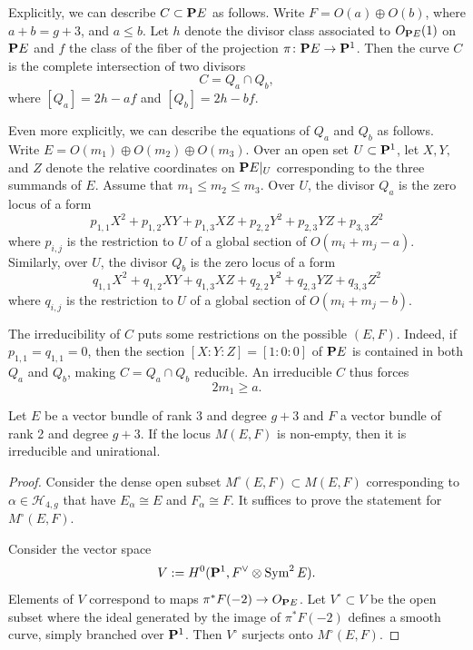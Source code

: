 \documentclass{article}
\renewcommand {\P}{{\bf P}}
\providecommand {\from}{{\colon}}
\providecommand{\Sym}{\operatorname{Sym}}
\renewcommand{\H}{\mathcal H}
\numberwithin{equation}{section}
\begin{document}
Explicitly, we can describe $C \subset \P E$ as follows. Write $F =
O(a) \oplus O(b)$, where $a+b = g+3$, and $a \leq b$. Let $h$ denote
the divisor class associated to $O_{\P E}(1)$ on $\P E$ and $f$ the
class of the fiber of the projection $\pi \from \P E \to \P^1$. Then
the curve $C$ is the complete intersection of two divisors
\[C = Q_{a} \cap Q_{b},\] 
where $[Q_{a}] = 2h-af$ and $[Q_{b}] = 2h-bf$.

Even more explicitly, we can describe the equations of $Q_a$ and $Q_b$
as follows.  Write $E = O(m_{1}) \oplus O(m_{2}) \oplus
O(m_{3})$. Over an open set $U \subset \P^1$, let $X, Y,$ and $Z$
denote the relative coordinates on $\P E|_U$ corresponding to the
three summands of $E$. Assume that $m_{1} \leq m_{2} \leq m_{3}$. Over
$U$, the divisor $Q_{a}$ is the zero locus of a form
\begin{equation}\label{relativequadrica}
  p_{1,1}X^2 + p_{1,2}XY + p_{1,3}XZ + p_{2,2}Y^2 + p_{2,3}YZ + p_{3,3}Z^2
\end{equation}
where $p_{i,j}$ is the restriction to $U$ of a global section of
$O(m_{i} + m_{j} -a)$. Similarly, over $U$, the divisor $Q_{b}$ is the
zero locus of a form
\begin{equation}\label{relativequadricb}
q_{1,1}X^2 + q_{1,2}XY + q_{1,3}XZ + q_{2,2}Y^2 + q_{2,3}YZ + q_{3,3}Z^2
\end{equation}
where $q_{i,j}$ is the restriction to $U$ of a global section of
$O(m_{i} + m_{j} -b)$.

The irreducibility of $C$ puts some restrictions on the possible
$(E,F)$. Indeed, if $p_{1,1} = q_{1,1} = 0$, then the section $[X:Y:Z]
= [1:0:0]$ of $\P E$ is contained in both $Q_{a}$ and $Q_{b}$, making
$C = Q_a \cap Q_b$ reducible. An irreducible $C$ thus forces
\begin{equation}\label{splitdirectrix}
  2m_1 \geq a.
\end{equation}

\begin{proposition}\label{thm:Mef_irred}
  Let $E$ be a vector bundle of rank 3 and degree $g+3$ and $F$ a
  vector bundle of rank 2 and degree $g+3$. If the locus $M(E, F)$
  is non-empty, then it is irreducible and unirational.
\end{proposition}
\begin{proof}
  Consider the dense open subset $M^\circ(E, F) \subset M(E,F)$ corresponding to $\alpha \in \H_{4,g}$ that have
  $E_\alpha \cong E$ and $F_\alpha \cong F$. It suffices to prove the
  statement for $M^\circ(E,F)$.

  Consider the vector space 
  \[ V := H^0(\P^1, F^\vee \otimes \Sym^2 E).\] Elements of $V$
  correspond to maps $\pi^* F(-2) \to O_{\P E}$. Let $V^\circ \subset
  V$ be the open subset where the ideal generated by the image of
  $\pi^*F(-2)$ defines a smooth curve, simply branched over
  $\P^1$. Then $V^\circ$ surjects onto $M^\circ(E,F)$.
\end{proof}
\end{document}
